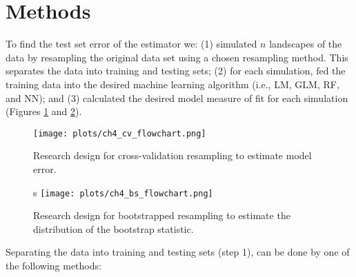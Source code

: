 \section{Methods}
To find the test set error of the estimator we: (1) simulated $n$ landscapes of the data by resampling the original data set using a chosen resampling method. This separates the data into training and testing sets; (2) for each simulation, fed the training data into the desired machine learning algorithm (i.e., LM, GLM, RF, and NN); and (3) calculated the desired model measure of fit for each simulation (Figures \ref{fig:cvmethods} and \ref{fig:bsmethods}).


\begin{figure}[ht]
	\centering
	\texttt{[image: plots/ch4\_cv\_flowchart.png]}
	\caption[Cross-validation research design.]{Research design for cross-validation resampling to estimate model error.} 
	\label{fig:cvmethods}
\end{figure}

\begin{figure}[ht]s
	\centering
	\texttt{[image: plots/ch4\_bs\_flowchart.png]}
	\caption[Bootstrapping research design.]{Research design for bootstrapped resampling to estimate the distribution of the bootstrap statistic.} 
	\label{fig:bsmethods}
\end{figure}

Separating the data into training and testing sets (step 1), can be done by one of the following methods: 

